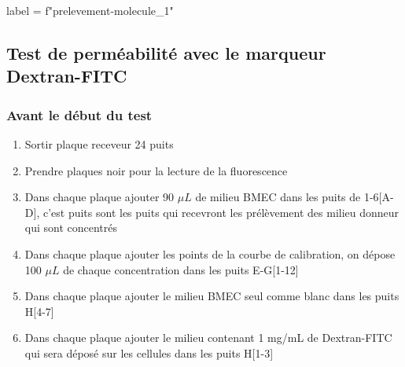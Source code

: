 \begin{pycode}
label = f"prelevement-{molecule_1}"
\end{pycode}

\subsection{Test de perméabilité avec le marqueur Dextran-FITC}

\subsubsection{Avant le début du test}

\begin{enumerate}
\item Sortir  plaque receveur 24 puits 
\item Prendre   plaques noir pour la lecture de la fluorescence
\item Dans chaque plaque ajouter 90 $\mu L$ de milieu BMEC dans les puits de 1-6[A-D], c'est puits sont les puits qui recevront les prélèvement des milieu donneur qui sont concentrés
\item Dans chaque plaque ajouter les points de la courbe de calibration, on dépose 100 $\mu L$ de chaque concentration dans les puits E-G[1-12]
\item Dans chaque plaque ajouter le milieu BMEC seul comme blanc dans les puits H[4-7]
\item Dans chaque plaque ajouter le milieu contenant 1 mg/mL de Dextran-FITC qui sera déposé sur les cellules dans les puits H[1-3]  
\end{enumerate}

